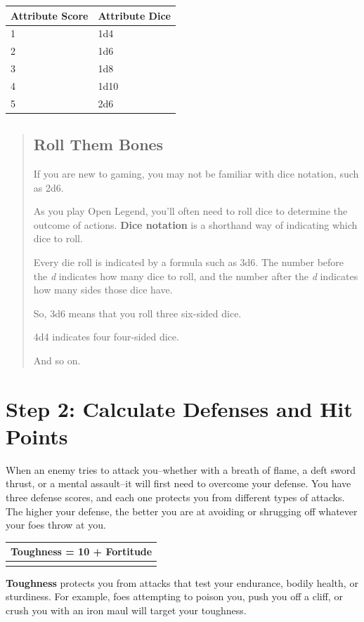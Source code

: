 \documentclass[12pt]{report}
\begin{document}
\begin{longtable}[c]{@{}ll@{}}
\toprule
Attribute Score & Attribute Dice\tabularnewline
\midrule
\endhead
1 & 1d4\tabularnewline
2 & 1d6\tabularnewline
3 & 1d8\tabularnewline
4 & 1d10\tabularnewline
5 & 2d6\tabularnewline
\bottomrule
\end{longtable}

\begin{quote}
\subsection{Roll Them Bones}\label{roll-them-bones}

If you are new to gaming, you may not be familiar with dice notation,
such as 2d6.

As you play Open Legend, you'll often need to roll dice to determine the
outcome of actions. \textbf{Dice notation} is a shorthand way of
indicating which dice to roll.

Every die roll is indicated by a formula such as 3d6. The number before
the \emph{d} indicates how many dice to roll, and the number after the
\emph{d} indicates how many sides those dice have.

So, 3d6 means that you roll three six-sided dice.

4d4 indicates four four-sided dice.

And so on.
\end{quote}

\section{Step 2: Calculate Defenses and Hit
Points}\label{step-2-calculate-defenses-and-hit-points}

When an enemy tries to attack you--whether with a breath of flame, a
deft sword thrust, or a mental assault--it will first need to overcome
your defense. You have three defense scores, and each one protects you
from different types of attacks. The higher your defense, the better you
are at avoiding or shrugging off whatever your foes throw at you.

\begin{longtable}[c]{@{}l@{}}
\toprule
Toughness = 10 + Fortitude\tabularnewline
\midrule
\endhead
\tabularnewline
\bottomrule
\end{longtable}

\textbf{Toughness} protects you from attacks that test your endurance,
bodily health, or sturdiness. For example, foes attempting to poison
you, push you off a cliff, or crush you with an iron maul will target
your toughness.
\end{document}
